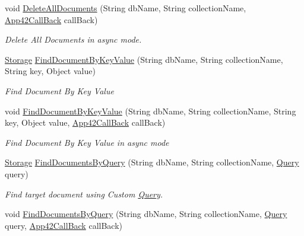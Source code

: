 \begin{DoxyCompactItemize}
void \hyperlink{classcom_1_1shephertz_1_1app42_1_1paas_1_1sdk_1_1csharp_1_1storage_1_1_storage_service_a14a4a7ede492b1b536d21076d25a23ae}{Delete\+All\+Documents} (String db\+Name, String collection\+Name, \hyperlink{interfacecom_1_1shephertz_1_1app42_1_1paas_1_1sdk_1_1csharp_1_1_app42_call_back}{App42\+Call\+Back} call\+Back)
\begin{DoxyCompactList}\small\item\em Delete All Documents in async mode. \end{DoxyCompactList}\item 
\hyperlink{classcom_1_1shephertz_1_1app42_1_1paas_1_1sdk_1_1csharp_1_1storage_1_1_storage}{Storage} \hyperlink{classcom_1_1shephertz_1_1app42_1_1paas_1_1sdk_1_1csharp_1_1storage_1_1_storage_service_a432e9997e760ef3be6ba941874f0b07a}{Find\+Document\+By\+Key\+Value} (String db\+Name, String collection\+Name, String key, Object value)
\begin{DoxyCompactList}\small\item\em Find Document By Key Value \end{DoxyCompactList}\item 
void \hyperlink{classcom_1_1shephertz_1_1app42_1_1paas_1_1sdk_1_1csharp_1_1storage_1_1_storage_service_a536733a12cbdeade7d60c2167911ad8f}{Find\+Document\+By\+Key\+Value} (String db\+Name, String collection\+Name, String key, Object value, \hyperlink{interfacecom_1_1shephertz_1_1app42_1_1paas_1_1sdk_1_1csharp_1_1_app42_call_back}{App42\+Call\+Back} call\+Back)
\begin{DoxyCompactList}\small\item\em Find Document By Key Value in async mode \end{DoxyCompactList}\item 
\hyperlink{classcom_1_1shephertz_1_1app42_1_1paas_1_1sdk_1_1csharp_1_1storage_1_1_storage}{Storage} \hyperlink{classcom_1_1shephertz_1_1app42_1_1paas_1_1sdk_1_1csharp_1_1storage_1_1_storage_service_a23394da47859d270c648b2b54b8295bc}{Find\+Documents\+By\+Query} (String db\+Name, String collection\+Name, \hyperlink{classcom_1_1shephertz_1_1app42_1_1paas_1_1sdk_1_1csharp_1_1storage_1_1_query}{Query} query)
\begin{DoxyCompactList}\small\item\em Find target document using Custom \hyperlink{classcom_1_1shephertz_1_1app42_1_1paas_1_1sdk_1_1csharp_1_1storage_1_1_query}{Query}. \end{DoxyCompactList}\item 
void \hyperlink{classcom_1_1shephertz_1_1app42_1_1paas_1_1sdk_1_1csharp_1_1storage_1_1_storage_service_a87f93c3b0db85c513b6766f21f5e78f7}{Find\+Documents\+By\+Query} (String db\+Name, String collection\+Name, \hyperlink{classcom_1_1shephertz_1_1app42_1_1paas_1_1sdk_1_1csharp_1_1storage_1_1_query}{Query} query, \hyperlink{interfacecom_1_1shephertz_1_1app42_1_1paas_1_1sdk_1_1csharp_1_1_app42_call_back}{App42\+Call\+Back} call\+Back)

\end{DoxyCompactItemize}
